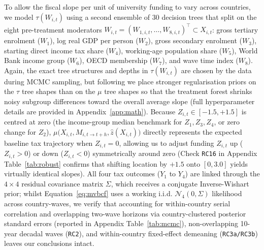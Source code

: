 \documentclass[11pt,a4paper]{article}
\begin{document}
To allow the fiscal slope per unit of university funding to vary across countries, we model $\tau(W_{i,t})$ using a second ensemble of 30 decision trees that split on the eight pre-treatment moderators $W_{i,t} = (W_{1,i,t}, \dots, W_{8,i,t})^\top \subset X_{i,t}$: gross tertiary enrolment ($W_1$), log real GDP per person ($W_2$), gross secondary enrolment ($W_3$), starting direct income tax share ($W_4$), working-age population share ($W_5$), World Bank income group ($W_6$), OECD membership ($W_7$), and wave time index ($W_8$). Again, the exact tree structures and depths in $\tau(W_{i,t})$ are chosen by the data during MCMC sampling, but following \citet{hahn2020bayesian} we place stronger regularisation priors on the $\tau$ tree shapes than on the $\mu$ tree shapes so that the treatment forest shrinks noisy subgroup differences toward the overall average slope (full hyperparameter details are provided in Appendix~\ref{app:math}). Because $Z_{i,t} \in [-1.5, +1.5]$ is centred at zero (the income-group median benchmark for $Z_1, Z_3, Z_4$, or zero change for $Z_2$), $\mu\bigl(X_{i,t}, M_{i,t\to t+h}, \hat{z}(X_{i,t})\bigr)$ directly represents the expected baseline tax trajectory when $Z_{i,t} = 0$, allowing us to adjust funding $Z_{i,t}$ up ($Z_{i,t} > 0$) or down ($Z_{i,t} < 0$) symmetrically around zero (Check \texttt{RC16} in Appendix Table~\ref{tab:robust} confirms that shifting location by $+1.5$ onto $[0, 3.0]$ yields virtually identical slopes). All four tax outcomes ($Y_1$ to $Y_4$) are linked through the $4 \times 4$ residual covariance matrix $\Sigma$, which receives a conjugate Inverse-Wishart prior; whilst Equation~\eqref{eq:mvbcf} uses a working i.i.d. $\mathcal{N}_4(0, \Sigma)$ likelihood across country-waves, we verify that accounting for within-country serial correlation and overlapping two-wave horizons via country-clustered posterior standard errors (reported in Appendix Table~\ref{tab:mcmc}), non-overlapping 10-year decadal waves (\texttt{RC2}), and within-country fixed-effect demeaning (\texttt{RC3a/RC3b}) leaves our conclusions intact.
\end{document}
